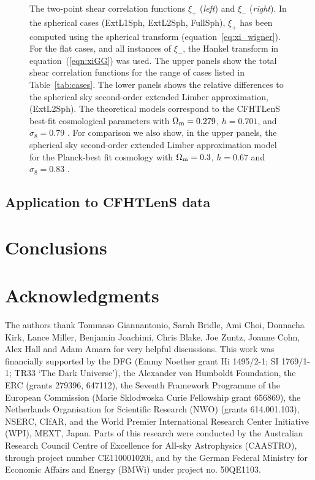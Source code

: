 \documentclass[fleqn,usenatbib]{mnras} %
\begin{document}
\begin{figure}
  \caption{The two-point shear correlation functions $\xi_+$ (\emph{left}) and $\xi_-$ (\emph{right}).
  In the spherical cases (ExtL1Sph, ExtL2Sph, FullSph), $\xi_+$ has been computed using the spherical
  transform (equation~\ref{eq:xi_wigner}). For the flat cases, and all instances of $\xi_-$, the Hankel transform
  in equation~(\ref{eqn:xiGG}) was used.
  The upper panels
  show the total shear correlation functions for the range of cases listed in Table~\ref{tab:cases}.
    The lower panels shows the relative differences to the spherical sky second-order extended Limber approximation, (ExtL2Sph).
     The theoretical models correspond to the CFHTLenS best-fit cosmological parameters with
    $\Omega_{\rm m} = 0.279$, $h=0.701$, and $\sigma_8 = 0.79$ \citep{CFHTLenS-2pt-notomo}.  For comparison we
    	also show, in the upper panels, the spherical sky second-order extended Limber approximation model for the Planck-best fit
    cosmology with $\Omega_{\rm m} = 0.3$, $h=0.67$ and $\sigma_8 = 0.83$ \citep{2015arXiv150201589P}.
  }

  \label{fig:xi_pm}

\end{figure}



\subsection{Application to CFHTLenS data}
\label{sec:cfhtlens}






\section{Conclusions}


\section*{Acknowledgments}

The authors thank Tommaso Giannantonio, Sarah Bridle, Ami Choi, Donnacha Kirk,
Lance Miller, Benjamin Joachimi, Chris Blake, Joe Zuntz, Joanne Cohn, Alex Hall and Adam Amara for very helpful
discussions. This work was financially supported by the DFG (Emmy Noether grant
Hi 1495/2-1; SI 1769/1-1; TR33 `The Dark Universe'), the Alexander von Humboldt
Foundation, the ERC (grants 279396, 647112), the Seventh Framework Programme of
the European Commission (Marie Sklodwoska Curie Fellowship grant 656869), the
Netherlands Organisation for Scientific Research (NWO) (grants 614.001.103),
NSERC, CIfAR, and the World Premier International Research Center Initiative
(WPI), MEXT, Japan. Parts of this research were conducted by the Australian
Research Council Centre of Excellence for All-sky Astrophysics (CAASTRO),
through project number CE110001020i, and by the German Federal
Ministry for Economic Affairs and Energy (BMWi) under
project no. 50QE1103.
\end{document}
